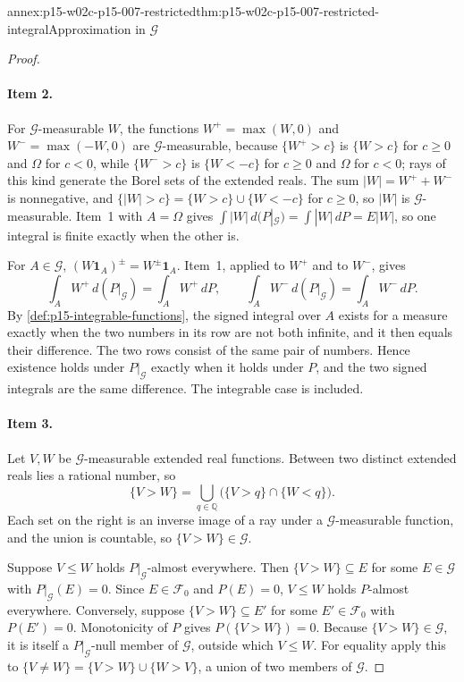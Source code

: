 \begin{annexitem}{annex:p15-w02c-p15-007-restricted}{thm:p15-w02c-p15-007-restricted-integral}{Approximation in \(\mathcal G\)}
\begin{proof}
\paragraph{Item 2.}
For \(\mathcal G\)-measurable \(W\), the functions
\(W^+=\max(W,0)\) and \(W^-=\max(-W,0)\) are \(\mathcal G\)-measurable,
because \(\{W^+>c\}\) is \(\{W>c\}\) for \(c\geq0\) and \(\Omega\) for
\(c<0\), while \(\{W^->c\}\) is \(\{W<-c\}\) for \(c\geq0\) and \(\Omega\)
for \(c<0\);
rays of this kind generate the Borel sets of the extended reals. The sum
\(|W|=W^++W^-\) is nonnegative, and
\(\{|W|>c\}=\{W>c\}\cup\{W<-c\}\) for \(c\geq0\), so \(|W|\) is
\(\mathcal G\)-measurable. Item~1 with \(A=\Omega\) gives
\(\int|W|\,d(P|_{\mathcal G})=\int|W|\,dP=E|W|\), so one integral is
finite exactly when the other is.

For \(A\in\mathcal G\), \((W\mathbf1_A)^\pm=W^\pm\mathbf1_A\). Item~1,
applied to \(W^+\) and to \(W^-\), gives
\[
 \int_AW^+\,d(P|_{\mathcal G})=\int_AW^+\,dP,\qquad
 \int_AW^-\,d(P|_{\mathcal G})=\int_AW^-\,dP .
\]
By \cref{def:p15-integrable-functions}, the signed integral over \(A\)
exists for a measure exactly when the two numbers in its row are not both
infinite, and it then equals their difference. The two rows consist of the
same pair of numbers. Hence existence holds under \(P|_{\mathcal G}\)
exactly when it holds under \(P\), and the two signed integrals are the same
difference. The integrable case is included.

\paragraph{Item 3.}
Let \(V,W\) be \(\mathcal G\)-measurable extended real functions. Between
two distinct extended reals lies a rational number, so
\[
 \{V>W\}=\bigcup_{q\in\mathbb Q}\bigl(\{V>q\}\cap\{W<q\}\bigr).
\]
Each set on the right is an inverse image of a ray under a
\(\mathcal G\)-measurable function, and the union is countable, so
\(\{V>W\}\in\mathcal G\).

Suppose \(V\leq W\) holds \(P|_{\mathcal G}\)-almost everywhere. Then
\(\{V>W\}\subseteq E\) for some \(E\in\mathcal G\) with
\(P|_{\mathcal G}(E)=0\). Since \(E\in\mathcal F_0\) and \(P(E)=0\),
\(V\leq W\) holds \(P\)-almost everywhere. Conversely, suppose
\(\{V>W\}\subseteq E'\) for some \(E'\in\mathcal F_0\) with \(P(E')=0\).
Monotonicity of \(P\) gives \(P(\{V>W\})=0\). Because
\(\{V>W\}\in\mathcal G\), it is itself a \(P|_{\mathcal G}\)-null member
of \(\mathcal G\), outside which \(V\leq W\). For equality apply this to
\(\{V\neq W\}=\{V>W\}\cup\{W>V\}\), a union of two members of
\(\mathcal G\).


\end{proof}
\end{annexitem}
